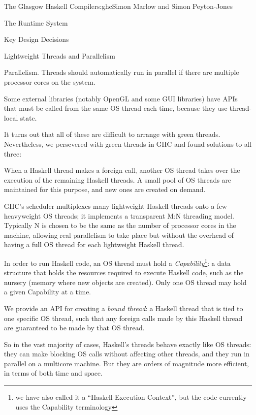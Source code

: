 \begin{aosachapter}{The Glasgow Haskell Compiler}{s:ghc}{Simon Marlow and Simon Peyton-Jones}
\begin{aosasect1}{The Runtime System}
\begin{aosasect2}{Key Design Decisions}
\begin{aosasect3}{Lightweight Threads and Parallelism}
\begin{aosaitemize}
\item Parallelism.  Threads should automatically run in parallel if
  there are multiple processor cores on the system.

\item Some external libraries (notably OpenGL and some GUI libraries)
  have APIs that must be called from the same OS thread each time,
  because they use thread-local state.

\end{aosaitemize}

It turns out that all of these are difficult to arrange with green
threads.  Nevertheless, we persevered with green threads in GHC and
found solutions to all three:

\begin{aosaitemize}

\item When a Haskell thread makes a foreign call, another OS thread
  takes over the execution of the remaining Haskell threads.  A small
  pool of OS threads are maintained for this purpose, and new ones are
  created on demand.

\item GHC's scheduler multiplexes many lightweight Haskell threads
  onto a few heavyweight OS threads; it implements a transparent M:N
  threading model.  Typically N is chosen to be the same as the number
  of processor cores in the machine, allowing real parallelism to take
  place but without the overhead of having a full OS thread for each
  lightweight Haskell thread.

  In order to run Haskell code, an OS thread must hold a
  \emph{Capability}\footnote{we have also called it a ``Haskell
    Execution Context'', but the code currently uses the Capability
    terminology}: a data structure that holds the resources required
  to execute Haskell code, such as the nursery (memory where new
  objects are created).  Only one OS thread may hold a given
  Capability at a time.

\item We provide an API for creating a \emph{bound thread}: a Haskell
  thread that is tied to one specific OS thread, such that any foreign
  calls made by this Haskell thread are guaranteed to be made by that
  OS thread.

\end{aosaitemize}

So in the vast majority of cases, Haskell's threads behave exactly
like OS threads: they can make blocking OS calls without affecting
other threads, and they run in parallel on a multicore machine.  But
they are orders of magnitude more efficient, in terms of both time and
space.


\end{aosasect3}
\end{aosasect2}
\end{aosasect1}
\end{aosachapter}
